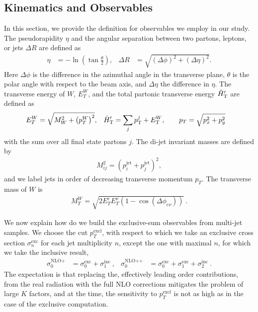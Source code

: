 \subsection{Kinematics and Observables}
\label{sec:kin}
In this section, we provide the definition for observables we employ in our study.
The pseudorapidity $\eta$ and the
angular separation between two partons, leptons, or jets $\Delta R$ are defined as
\begin{align}
  \eta &= -\ln\left(\tan\frac{\theta}{2}\right),&  \Delta R &= \sqrt{(\Delta \phi)^2+(\Delta \eta)^2}.
\end{align}
Here $\Delta\phi$ is the difference in the azimuthal angle in the transverse plane,
$\theta$ is the polar angle with respect to the beam axis, and
$\Delta\eta$ the difference in $\eta$. 
The transverse energy of $W$, $E_T^W$, and the total partonic transverse energy ${\hat H}_{\mathrm T}'$ are defined as
\begin{align}\label{eq:htpart}
  E_T^W&=\sqrt{M_W^2+\left(p_T^W \right)^2},& {\hat H}_{\mathrm T}'&=\sum_j p_{\textrm T}^j+E_{\textrm T}^W, \qquad p_T=\sqrt{p_x^2+p_y^2}
\end{align}
with the sum over all final state partons $j$.
The di-jet invariant masses are defined by
\begin{align}
  M_{ij}^2 = \left(p_i^{\text{jet}}+p_j^{\text{jet}}\right)^2,
\end{align}
and we label  jets in order of decreasing transverse momentum $p_T$. 
The transverse mass of $W$ is
\begin{align}
  M_T^W=\sqrt{2E_T^eE_T^\nu(1-\cos(\Delta\phi_{e\nu}))}\ .
\end{align}

We now explain how do we build the exclusive-sum observables from multi-jet samples.
We choose the cut $p_{T}^{\text{excl}}$, with respect to which we take an exclusive cross section $\sigma^{\text{exc}}_n$
for each jet multiplicity $n$, except the one with maximal  $n$, for which we take the inclusive result,
\begin{align}\label{eq:excsums}
  \sigma^{\text{NLO+}}_0 &= \sigma^{\text{exc}}_0 + \sigma^{\text{inc}}_1\ , &
\sigma^{\text{NLO++}}_0 &= \sigma^{\text{exc}}_0 +\sigma^{\text{exc}}_1+
\sigma^{\text{inc}}_2\ .
\end{align}
The expectation is that replacing the, effectively leading order contributions, from the real radiation with the full NLO
corrections mitigates the problem of large $K$ factors, and at the time, the sensitivity to $p_{T}^{\text{excl}}$ is not as high 
as in the case of the exclusive computation.

